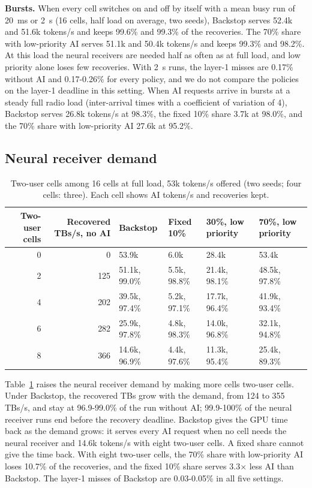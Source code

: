 \documentclass[acmsmall,screen,review,anonymous]{acmart}
\newcommand{\sys}{Backstop\xspace}
\begin{document}
\noindent\textbf{Bursts.} When every cell switches on and off by itself with a mean busy run of 20~ms or
2~s (16 cells, half load on average, two seeds), \sys serves 52.4k and 51.6k tokens/s and keeps 99.6\% and
99.3\% of the recoveries. The 70\% share with low-priority AI serves 51.1k and 50.4k tokens/s and keeps
99.3\% and 98.2\%. At this load the neural receivers are needed half as often as at full load, and low
priority alone loses few recoveries. With 2~s runs, the layer-1 misses are 0.17\% without AI and
0.17-0.26\% for every policy, and we do not compare the policies on the layer-1 deadline in this setting.
When AI requests arrive in bursts at a steady full radio load (inter-arrival times with a coefficient of
variation of 4), \sys serves 26.8k tokens/s at 98.3\%, the fixed 10\% share 3.7k at 98.0\%, and the 70\%
share with low-priority AI 27.6k at 95.2\%.

\subsection{Neural receiver demand}

\begin{table}[t]
\caption{Two-user cells among 16 cells at full load, 53k tokens/s offered (two seeds; four cells: three).
Each cell shows AI tokens/s and recoveries kept.}
\label{tab:demand}
\footnotesize
\begin{tabular}{@{}rrllll@{}}
\toprule
Two-user cells & Recovered TBs/s, no AI & \sys & Fixed 10\% & 30\%, low priority & 70\%, low priority \\
\midrule
0 & 0 & 53.9k & 6.0k & 28.4k & 53.4k \\
2 & 125 & 51.1k, 99.0\% & 5.5k, 98.8\% & 21.4k, 98.1\% & 48.5k, 97.8\% \\
4 & 202 & 39.5k, 97.4\% & 5.2k, 97.1\% & 17.7k, 96.4\% & 41.9k, 93.4\% \\
6 & 282 & 25.9k, 97.8\% & 4.8k, 98.3\% & 14.0k, 96.8\% & 32.1k, 94.8\% \\
8 & 366 & 14.6k, 96.9\% & 4.4k, 97.6\% & 11.3k, 95.4\% & 25.4k, 89.3\% \\
\bottomrule
\end{tabular}
\end{table}

Table~\ref{tab:demand} raises the neural receiver demand by making more cells two-user cells. Under \sys,
the recovered TBs grow with the demand, from 124 to 355 TBs/s, and stay at 96.9-99.0\% of the run without
AI; 99.9-100\% of the neural receiver runs end before the recovery deadline. \sys gives the GPU time back
as the demand grows: it serves every AI request when no cell needs the neural receiver and 14.6k tokens/s
with eight two-user cells. A fixed share cannot give the time back. With eight two-user cells, the 70\%
share with low-priority AI loses 10.7\% of the recoveries, and the fixed 10\% share serves 3.3$\times$ less
AI than \sys. The layer-1 misses of \sys are 0.03-0.05\% in all five settings.
\end{document}
